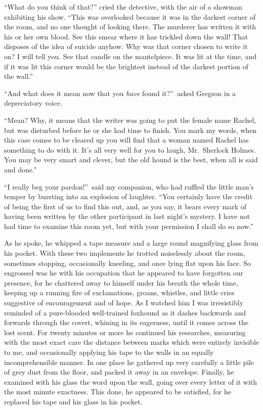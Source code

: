 \documentclass[12pt,english]{book}
\begin{document}
{}

{}``What do you think of that?'' cried the detective, with the air
of a showman exhibiting his show. {}``This was overlooked because
it was in the darkest corner of the room, and no one thought of looking
there. The murderer has written it with his or her own blood. See
this smear where it has trickled down the wall! That disposes of the
idea of suicide anyhow. Why was that corner chosen to write it on?
I will tell you. See that candle on the mantelpiece. It was lit at
the time, and if it was lit this corner would be the brightest instead
of the darkest portion of the wall.''

{}``And what does it mean now that you \textit{have} found it?''\ asked
Gregson in a depreciatory voice.

{}``Mean? Why, it means that the writer was going to put the female
name Rachel, but was disturbed before he or she had time to finish.
You mark my words, when this case comes to be cleared up you will
find that a woman named Rachel has something to do with it. It's all
very well for you to laugh, Mr.\ Sherlock Holmes. You may be very
smart and clever, but the old hound is the best, when all is said
and done.''

{}``I really beg your pardon!''\ said my companion, who had ruffled
the little man's temper by bursting into an explosion of laughter.
{}``You certainly have the credit of being the first of us to find
this out, and, as you say, it bears every mark of having been written
by the other participant in last night's mystery. I have not had time
to examine this room yet, but with your permission I shall do so now.''

As he spoke, he whipped a tape measure and a large round magnifying
glass from his pocket. With these two implements he trotted noiselessly
about the room, sometimes stopping, occasionally kneeling, and once
lying flat upon his face. So engrossed was he with his occupation
that he appeared to have forgotten our presence, for he chattered
away to himself under his breath the whole time, keeping up a running
fire of exclamations, groans, whistles, and little cries suggestive
of encouragement and of hope. As I watched him I was irresistibly
reminded of a pure-blooded well-trained foxhound as it dashes backwards
and forwards through the covert, whining in its eagerness, until it
comes across the lost scent. For twenty minutes or more he continued
his researches, measuring with the most exact care the distance between
marks which were entirely invisible to me, and occasionally applying
his tape to the walls in an equally incomprehensible manner. In one
place he gathered up very carefully a little pile of grey dust from
the floor, and packed it away in an envelope. Finally, he examined
with his glass the word upon the wall, going over every letter of
it with the most minute exactness. This done, he appeared to be satisfied,
for he replaced his tape and his glass in his pocket.
\end{document}

